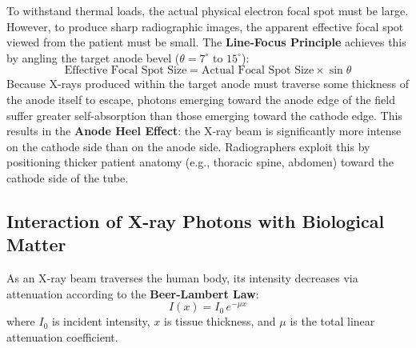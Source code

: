 \documentclass[11pt,a4paper]{article}
\begin{document}
\begin{physicsoverview}
To withstand thermal loads, the actual physical electron focal spot must be large. However, to produce sharp radiographic images, the apparent effective focal spot viewed from the patient must be small. The \textbf{Line-Focus Principle} achieves this by angling the target anode bevel ($\theta = 7^\circ\text{ to }15^\circ$):
\begin{equation}
    \text{Effective Focal Spot Size} = \text{Actual Focal Spot Size} \times \sin\theta
\end{equation}
Because X-rays produced within the target anode must traverse some thickness of the anode itself to escape, photons emerging toward the anode edge of the field suffer greater self-absorption than those emerging toward the cathode edge. This results in the \textbf{Anode Heel Effect}: the X-ray beam is significantly more intense on the cathode side than on the anode side. Radiographers exploit this by positioning thicker patient anatomy (e.g., thoracic spine, abdomen) toward the cathode side of the tube.
\end{physicsoverview}

\subsection{Interaction of X-ray Photons with Biological Matter}
As an X-ray beam traverses the human body, its intensity decreases via attenuation according to the \textbf{Beer-Lambert Law}:
\begin{equation}
    I(x) = I_0 \, e^{-\mu x}
\end{equation}
where $I_0$ is incident intensity, $x$ is tissue thickness, and $\mu$ is the total linear attenuation coefficient.
\end{document}
